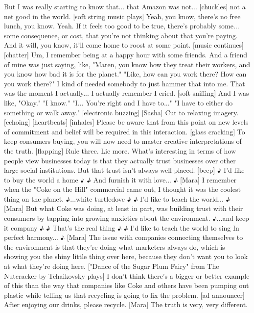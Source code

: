 \documentclass[a4paper]{article}
\begin{document}
	But I was really starting to know that... that Amazon was not... [chuckles]
	not a net good in the world.
	[soft string music plays]
	Yeah, you know, there's no free lunch, you know. Yeah.
	If it feels too good to be true, there's probably some... some consequence,
	or cost, that you're not thinking about that you're paying.
	And it will, you know, it'll come home to roost at some point.
	[music continues]
	[chatter]
	Um, I remember being at a happy hour with some friends.
	And a friend of mine was just saying, like,
	"Maren, you know how they treat their workers,
	and you know how bad it is for the planet."
	"Like, how can you work there? How can you work there?"
	I kind of needed somebody to just hammer that into me.
	That was the moment I actually... I actually remember I cried.
	[soft sniffing]
	And I was like, "Okay."
	"I know."
	"I... You're right and I have to..."
	"I have to either do something or walk away."
	[electronic buzzing]
	[Sasha] Cut to relaxing imagery. [echoing]
	[heartbeats]
	[inhales]
	Please be aware that from this point on
	new levels of commitment and belief will be required in this interaction.
	[glass cracking]
	To keep consumers buying,
	you will now need to master creative interpretations of the truth.
	[flapping]
	Rule three. Lie more.
	What's interesting in terms of how people view businesses today
	is that they actually trust businesses
	over other large social institutions.
	But that trust isn't always well-placed.
	[beep]
	♪ I'd like to buy the world a home ♪
	♪ And furnish it with love... ♪
	[Mara] I remember when the "Coke on the Hill" commercial came out,
	I thought it was the coolest thing on the planet.
	♪...white turtledove ♪
	♪ I'd like to teach the world... ♪
	[Mara] But what Coke was doing, at least in part,
	was building trust with their consumers
	by tapping into growing anxieties about the environment.
	♪...and keep it company ♪
	♪ That's the real thing ♪
	♪ I'd like to teach the world to sing In perfect harmony... ♪
	[Mara] The issue with companies connecting themselves to the environment
	is that they're doing what marketers always do,
	which is showing you the shiny little thing over here,
	because they don't want you to look at what they're doing here.
	["Dance of the Sugar Plum Fairy" from The Nutcracker by Tchaikovsky plays]
	I don't think there's a bigger or better example of this
	than the way that companies like Coke and others have been pumping out plastic
	while telling us that recycling is going to fix the problem.
	[ad announcer] After enjoying our drinks, please recycle.
	[Mara] The truth is very, very different.
\end{document}
